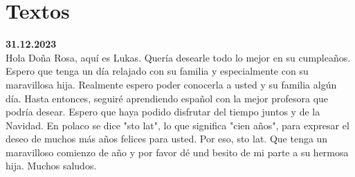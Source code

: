 \chapter{Textos}
\begin{textos}
    \textbf{31.12.2023}\\
    Hola Do\~na Rosa, aqu\'i es Lukas. Quer\'ia desearle 
    todo lo mejor en su cumplea\~nos. Espero que tenga un d\'ia
    relajado con su familia y especialmente con su maravillosa 
    hija. Realmente espero poder conocerla a usted y su familia
    alg\'un d\'ia. Hasta entonces, seguir\'e aprendiendo español
    con la mejor profesora que podr\'ia desear. Espero que haya
    podido disfrutar del tiempo juntos y de la Navidad. En polaco
    se dice "sto lat", lo que significa "cien a\~nos", para expresar
    el deseo de muchos m\'as a\~nos felices para usted. Por eso,
    sto lat. Que tenga un maravilloso comienzo de a\~no y por favor
    d\'e und besito de mi parte a su hermosa hija. Muchos saludos.
\end{textos}